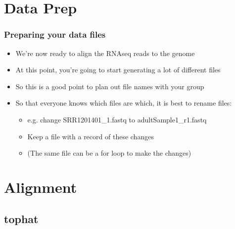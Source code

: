 \documentclass[14pt,handout]{beamer}
\begin{document}
\section{Data Prep}

\begin{frame}
\frametitle{Preparing your data files}
\begin{itemize}
	\item<+-> We're now ready to align the RNAseq reads to the genome
	\item<+-> At this point, you're going to start generating a lot of different files
	\item<+-> So this is a good point to plan out file names with your group
	\item<+-> So that everyone knows which files are which, it is best to rename files:
	\begin{itemize}
		\footnotesize
		\item<+-> e.g. change SRR1201401\_1.fastq to adultSample1\_r1.fastq
		\item<+-> Keep a file with a record of these changes
		\item<+-> (The same file can be a for loop to make the changes)
	\end{itemize}
\end{itemize}
\end{frame}

\section{Alignment}

\subsection{tophat}
\end{document}
